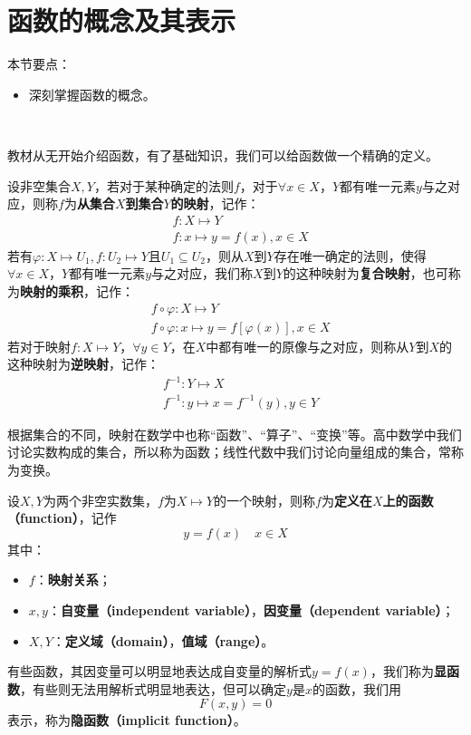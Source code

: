 \section{函数的概念及其表示}

本节要点：
\begin{itemize}
    \item 深刻掌握函数的概念。
\end{itemize}

~

教材从无开始介绍函数，有了基础知识，我们可以给函数做一个精确的定义。

\begin{definition}[映射]
设非空集合$X,Y$，若对于某种确定的法则$f$，对于$\forall x\in X$，$Y$都有唯一元素$y$与之对应，则称$f$为{\bf 从集合$X$到集合$Y$的映射}，记作：
\begin{align*}
&f:X\mapsto Y \\
&f:x\mapsto y=f\left( x \right) ,x\in X
\end{align*}
若有$\varphi :X\mapsto U_1,f:U_2\mapsto Y$且$U_1\subseteq U_2$，则从$X$到$Y$存在唯一确定的法则，使得$\forall x\in X$，$Y$都有唯一元素$y$与之对应，我们称$X$到$Y$的这种映射为{\bf 复合映射}，也可称为{\bf 映射的乘积}，记作：
\begin{align*}
&f\circ \varphi :X\mapsto Y \\
&f\circ \varphi :x\mapsto y=f\left[ \varphi \left( x \right) \right] ,x\in X
\end{align*}
若对于映射$f:X\mapsto Y$，$\forall y\in Y$，在$X$中都有唯一的原像与之对应，则称从$Y$到$X$的这种映射为{\bf 逆映射}，记作：
\begin{align*}
&f^{-1}:Y\mapsto X \\
&f^{-1}:y\mapsto x=f^{-1}\left( y \right) ,y\in Y
\end{align*}
\end{definition}

根据集合的不同，映射在数学中也称“函数”、“算子”、“变换”等。高中数学中我们讨论实数构成的集合，所以称为函数；线性代数中我们讨论向量组成的集合，常称为变换。

\begin{definition}[函数]
设$X,Y$为两个非空实数集，$f$为$X\mapsto Y$的一个映射，则称$f$为{\bf 定义在$X$上的函数（function）}，记作
\[
y=f\left( x \right) \quad x\in X
\]
其中：
\begin{itemize}
    \item $f$：{\bf 映射关系}；
    \item $x,y$：{\bf 自变量（independent variable）}，{\bf 因变量（dependent variable）}；
    \item $X,Y$：{\bf 定义域（domain）}，{\bf 值域（range）}。
\end{itemize}
有些函数，其因变量可以明显地表达成自变量的解析式$y=f\left( x \right) $，我们称为{\bf 显函数}，有些则无法用解析式明显地表达，但可以确定$y$是$x$的函数，我们用
\[
F\left( x,y \right) =0
\]
表示，称为{\bf 隐函数（implicit function）}。
\end{definition}

